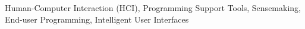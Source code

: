 

\begin{cventries}
  \vspace{-3.0mm}
  \cventry
    {} %
    {} %
    {} %
    {} %
    {
      \begin{cvitems} %
        Human-Computer Interaction (HCI), Programming Support Tools, Sensemaking, End-user Programming, Intelligent User Interfaces
      \end{cvitems}
    }
    
\end{cventries}
\vspace{-2.0mm}